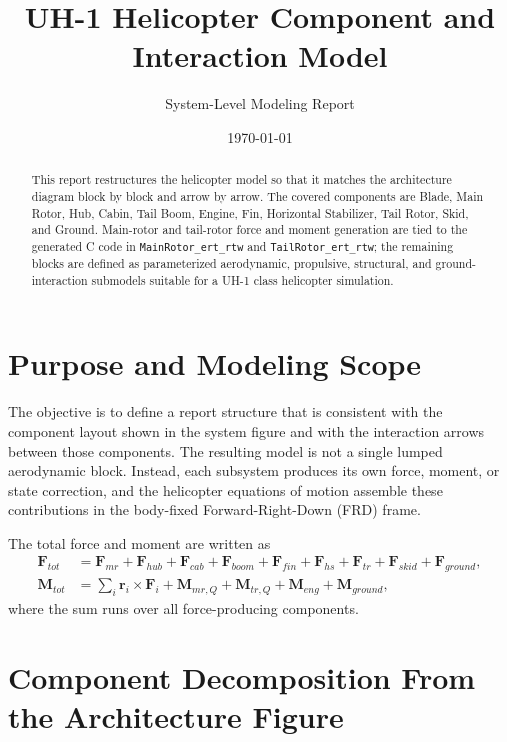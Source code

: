 \documentclass[12pt,a4paper]{article}
\title{UH-1 Helicopter Component and Interaction Model}
\author{System-Level Modeling Report}
\date{\today}
\begin{document}
\maketitle
\tableofcontents
\newpage

\begin{abstract}
This report restructures the helicopter model so that it matches the architecture diagram block by block and arrow by arrow. The covered components are Blade, Main Rotor, Hub, Cabin, Tail Boom, Engine, Fin, Horizontal Stabilizer, Tail Rotor, Skid, and Ground. Main-rotor and tail-rotor force and moment generation are tied to the generated C code in \texttt{MainRotor\_ert\_rtw} and \texttt{TailRotor\_ert\_rtw}; the remaining blocks are defined as parameterized aerodynamic, propulsive, structural, and ground-interaction submodels suitable for a UH-1 class helicopter simulation.
\end{abstract}

\section{Purpose and Modeling Scope}

The objective is to define a report structure that is consistent with the component layout shown in the system figure and with the interaction arrows between those components. The resulting model is not a single lumped aerodynamic block. Instead, each subsystem produces its own force, moment, or state correction, and the helicopter equations of motion assemble these contributions in the body-fixed Forward-Right-Down (FRD) frame.

The total force and moment are written as
\begin{align}
  \mathbf{F}_{tot} &=
  \mathbf{F}_{mr} +
  \mathbf{F}_{hub} +
  \mathbf{F}_{cab} +
  \mathbf{F}_{boom} +
  \mathbf{F}_{fin} +
  \mathbf{F}_{hs} +
  \mathbf{F}_{tr} +
  \mathbf{F}_{skid} +
  \mathbf{F}_{ground}, \\
  \mathbf{M}_{tot} &=
  \sum_i \mathbf{r}_i \times \mathbf{F}_i +
  \mathbf{M}_{mr,Q} +
  \mathbf{M}_{tr,Q} +
  \mathbf{M}_{eng} +
  \mathbf{M}_{ground},
\end{align}
where the sum runs over all force-producing components.

\section{Component Decomposition From the Architecture Figure}
\end{document}
